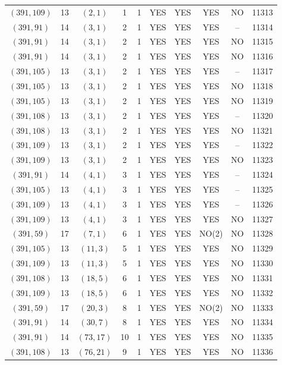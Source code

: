\begin{longtable}{|c|c|c|c|c|c|c|c|c|c|}
$(391, 109)$ & 13 & $(2, 1)$ & 1 & 1 & YES & YES & YES & NO & 11313\\
$(391, 91)$ & 14 & $(3, 1)$ & 2 & 1 & YES & YES & YES & -- & 11314\\
$(391, 91)$ & 14 & $(3, 1)$ & 2 & 1 & YES & YES & YES & NO & 11315\\
$(391, 91)$ & 14 & $(3, 1)$ & 2 & 1 & YES & YES & YES & NO & 11316\\
$(391, 105)$ & 13 & $(3, 1)$ & 2 & 1 & YES & YES & YES & -- & 11317\\
$(391, 105)$ & 13 & $(3, 1)$ & 2 & 1 & YES & YES & YES & NO & 11318\\
$(391, 105)$ & 13 & $(3, 1)$ & 2 & 1 & YES & YES & YES & NO & 11319\\
$(391, 108)$ & 13 & $(3, 1)$ & 2 & 1 & YES & YES & YES & -- & 11320\\
$(391, 108)$ & 13 & $(3, 1)$ & 2 & 1 & YES & YES & YES & NO & 11321\\
$(391, 109)$ & 13 & $(3, 1)$ & 2 & 1 & YES & YES & YES & -- & 11322\\
$(391, 109)$ & 13 & $(3, 1)$ & 2 & 1 & YES & YES & YES & NO & 11323\\
$(391, 91)$ & 14 & $(4, 1)$ & 3 & 1 & YES & YES & YES & -- & 11324\\
$(391, 105)$ & 13 & $(4, 1)$ & 3 & 1 & YES & YES & YES & -- & 11325\\
$(391, 109)$ & 13 & $(4, 1)$ & 3 & 1 & YES & YES & YES & -- & 11326\\
$(391, 109)$ & 13 & $(4, 1)$ & 3 & 1 & YES & YES & YES & NO & 11327\\
$(391, 59)$ & 17 & $(7, 1)$ & 6 & 1 & YES & YES & NO(2) & NO & 11328\\
$(391, 105)$ & 13 & $(11, 3)$ & 5 & 1 & YES & YES & YES & NO & 11329\\
$(391, 109)$ & 13 & $(11, 3)$ & 5 & 1 & YES & YES & YES & NO & 11330\\
$(391, 108)$ & 13 & $(18, 5)$ & 6 & 1 & YES & YES & YES & NO & 11331\\
$(391, 109)$ & 13 & $(18, 5)$ & 6 & 1 & YES & YES & YES & NO & 11332\\
$(391, 59)$ & 17 & $(20, 3)$ & 8 & 1 & YES & YES & NO(2) & NO & 11333\\
$(391, 91)$ & 14 & $(30, 7)$ & 8 & 1 & YES & YES & YES & NO & 11334\\
$(391, 91)$ & 14 & $(73, 17)$ & 10 & 1 & YES & YES & YES & NO & 11335\\
$(391, 108)$ & 13 & $(76, 21)$ & 9 & 1 & YES & YES & YES & NO & 11336\\

\end{longtable}
